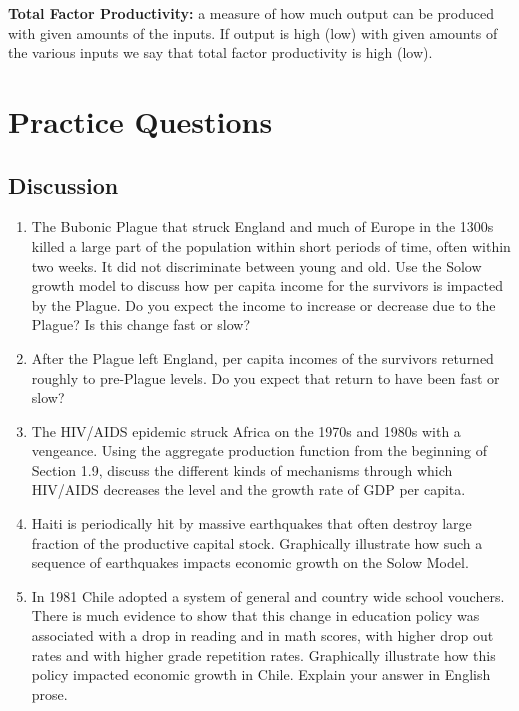 \documentclass[
]{book}
\providecommand{\tightlist}{%
  \setlength{\itemsep}{0pt}\setlength{\parskip}{0pt}}
\begin{document}
\textbf{Total Factor Productivity:} a measure of how much output can be produced with given amounts of the inputs. If output is high (low) with given amounts of the various inputs we say that total factor productivity is high (low).

\hypertarget{practice-questions-1}{%
\section{Practice Questions}\label{practice-questions-1}}

\hypertarget{discussion-1}{%
\subsection{Discussion}\label{discussion-1}}

\begin{enumerate}
\def\labelenumi{\arabic{enumi}.}
\tightlist
\item
  The Bubonic Plague that struck England and much of Europe in the 1300s killed a large part of the population within short periods of time, often within two weeks. It did not discriminate between young and old. Use the Solow growth model to discuss how per capita income for the survivors is impacted by the Plague. Do you expect the income to increase or decrease due to the Plague? Is this change fast or slow?
\item
  After the Plague left England, per capita incomes of the survivors returned roughly to pre-Plague levels. Do you expect that return to have been fast or slow?
\item
  The HIV/AIDS epidemic struck Africa on the 1970s and 1980s with a vengeance. Using the aggregate production function from the beginning of Section 1.9, discuss the different kinds of mechanisms through which HIV/AIDS decreases the level and the growth rate of GDP per capita.
\item
  Haiti is periodically hit by massive earthquakes that often destroy large fraction of the productive capital stock. Graphically illustrate how such a sequence of earthquakes impacts economic growth on the Solow Model.
\item
  In 1981 Chile adopted a system of general and country wide school vouchers. There is much evidence to show that this change in education policy was associated with a drop in reading and in math scores, with higher drop out rates and with higher grade repetition rates. Graphically illustrate how this policy impacted economic growth in Chile. Explain your answer in English prose.
\end{enumerate}
\end{document}

